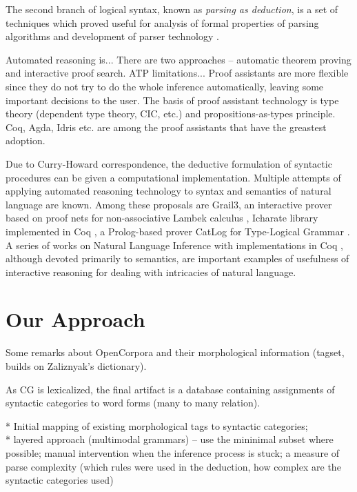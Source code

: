 \documentclass[a4paper]{article}
\theoremstyle{example-style}
\begin{document}
The second branch of logical syntax, known as \textit{parsing as deduction}, is a set of techniques which proved useful for analysis of formal properties of parsing algorithms and development of parser technology \parencite{pereira1983parsing,kallmeyer2010parsing}.

Automated reasoning is... There are two approaches -- automatic theorem proving and interactive proof search. ATP limitations... Proof assistants are more flexible since they do not try to do the whole inference automatically, leaving some important decisions to the user. The basis of proof assistant technology is type theory (dependent type theory, CIC, etc.) and propositions-as-types principle. Coq, Agda, Idris etc. are among the proof assistants that have the greastest adoption. 

Due to Curry-Howard correspondence, the deductive formulation of syntactic procedures can be given a computational implementation. Multiple attempts of applying automated reasoning technology to syntax and semantics of natural language are known. Among these proposals are Grail3, an interactive prover based on proof nets for non-associative Lambek calculus \parencite{moot2002proof}, Icharate library implemented in Coq \parencite{anoun2007approche}, a Prolog-based prover CatLog for Type-Logical Grammar \parencite{morrill2012catlog}. A series of works on Natural Language Inference with implementations in Coq \parencite{chatzikyriakidis2014natural}, although devoted primarily to semantics, are important examples of usefulness of interactive reasoning for dealing with intricacies of natural language.


\section{Our Approach}

Some remarks about OpenCorpora and their morphological information (tagset, builds on Zaliznyak's dictionary).

As CG is lexicalized, the final artifact is a database containing assignments of syntactic categories to word forms (many to many relation).

  * Initial mapping of existing morphological tags to syntactic categories; \\
  
  * layered approach (multimodal grammars) -- use the mininimal subset where possible; manual intervention when the inference process is stuck; a measure of parse complexity (which rules were used in the deduction, how complex are the syntactic categories used) \\
    
\end{document}
